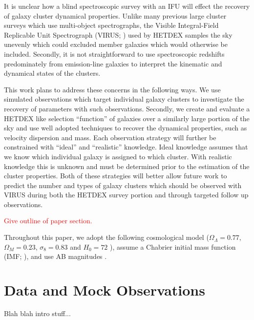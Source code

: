 \documentclass[apj, revtex4]{emulateapj}
\newcommand{\editorial}[1]{\textcolor{red}{#1}}
\begin{document}
It is unclear how a blind spectroscopic survey with an IFU will effect the recovery of galaxy cluster dynamical properties. Unlike many previous large cluster surveys  which use multi-object spectrographs, the Visible Integral-Field Replicable Unit Spectrograph (VIRUS; \citealt{Hill2012}) used by HETDEX samples the sky unevenly which could excluded member galaxies which would otherwise be included. Secondly, it is not straightforward to use spectroscopic redshifts predominately from emission-line galaxies to interpret the kinematic and dynamical states of the clusters.

This work plans to address these concerns in the following ways. We use simulated observations which target individual galaxy clusters to investigate the recovery of parameters with such observations. Secondly, we create and evaluate a HETDEX like selection ``function'' of galaxies over a similarly large portion of the sky and use well adopted techniques to recover the dynamical properties, such as velocity dispersion and mass. Each observation strategy will further be constrained with ``ideal'' and ``realistic'' knowledge. Ideal knowledge assumes that we know which individual galaxy is assigned to which cluster. With realistic knowledge this is unknown and must be determined prior to the estimation of the cluster properties. Both of these strategies will better allow future work to predict the number and types of galaxy clusters which should be observed with VIRUS during both the HETDEX survey portion and through targeted follow up observations.

\editorial{Give outline of paper section.}

Throughout this paper, we adopt the following cosmological model ($\Omega_\Lambda = 0.77$,
$\Omega_M = 0.23$, $\sigma_8 = 0.83$ and $H_0= 72$ \kms \mpc), assume a Chabrier initial mass function (IMF; \citealt{Chabrier2003}), and use AB magnitudes \citep{Oke1974}.

\section{Data and Mock Observations}\label{sec: Data}

Blah blah intro stuff... 
\end{document}

